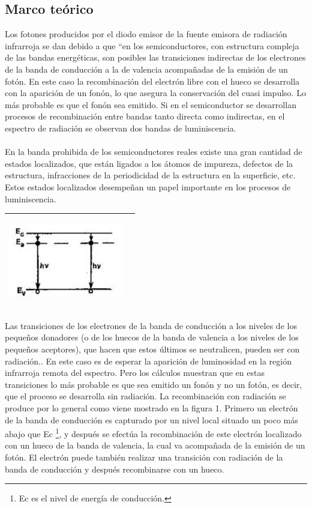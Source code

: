 \documentclass[12]{article}
\newenvironment{Figure}
{\par\medskip\noindent\minipage{\linewidth}}
{\endminipage\par\medskip}
\begin{document}
\begin{multicols}{2}
\section{Marco teórico}
Los fotones producidos por el diodo emisor de la fuente emisora de radiación infrarroja se dan debido a que “en los semiconductores, con estructura compleja de las bandas energéticas, son posibles las transiciones indirectas de los electrones de la banda de conducción  a la de valencia acompañadas de la emisión de un fotón. En este caso la recombinación del electrón libre con el hueco se desarrolla con la aparición de un fonón, lo que asegura la conservación del cuasi impulso. Lo más probable es que el fonón sea emitido. Si en el semiconductor se desarrollan procesos de recombinación entre bandas  tanto directa como indirectas, en el espectro de radiación se observan dos bandas de luminiscencia. \\ \\
En la banda prohibida de los semiconductores reales existe una gran cantidad de estados localizados, que están ligados a los átomos de impureza, defectos de la estructura, infracciones de la periodicidad de la estructura en la superficie, etc. Estos estados localizados desempeñan un papel importante  en los procesos de luminiscencia. 
\begin{Figure}	
\center
\begin{tabular}{|l|r|}
\hline
\includegraphics[width=5cm, height=4cm]{img/transiciones.png} \\ \hline
\end{tabular}
\label{fig:g1}
\end{Figure}
Las transiciones de los electrones de la banda de conducción a los niveles de los pequeños donadores (o de los huecos de la banda de valencia a los niveles de los pequeños aceptores),  que hacen que estos últimos se neutralicen, pueden ser con radiación.. En este caso es de esperar la aparición de luminosidad en la región infrarroja remota del espectro. Pero los cálculos  muestran que en estas transiciones lo más probable es que sea emitido un fonón y no un fotón, es decir, que el proceso se desarrolla sin radiación. La recombinación con radiación se produce por lo general  como viene mostrado en la figura 1. Primero un electrón de la banda de conducción es capturado por un nivel local situado un poco más abajo que Ec  \footnote{Ec es el nivel de energía de conducción.}, y después se efectúa la recombinación de este electrón localizado con un hueco de la banda de valencia, la cual va acompañada de la emisión de un fotón. El electrón puede también realizar una transición con radiación de la banda de conducción y después recombinarse con un hueco. \\

\end{multicols}
\end{document}
